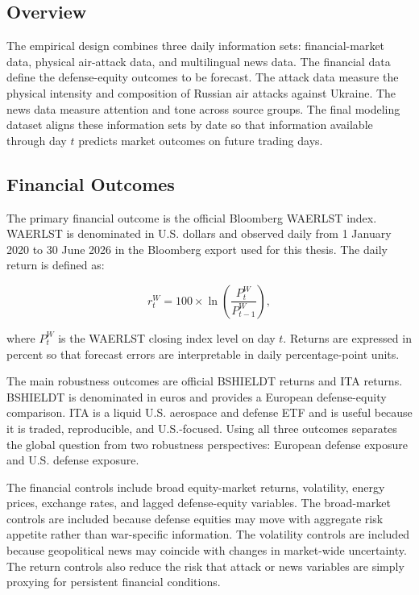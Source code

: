 \documentclass[12pt,a4paper]{article}
\begin{document}
\subsection{Overview}

The empirical design combines three daily information sets: financial-market data, physical air-attack data, and multilingual news data. The financial data define the defense-equity outcomes to be forecast. The attack data measure the physical intensity and composition of Russian air attacks against Ukraine. The news data measure attention and tone across source groups. The final modeling dataset aligns these information sets by date so that information available through day $t$ predicts market outcomes on future trading days.

\subsection{Financial Outcomes}

The primary financial outcome is the official Bloomberg WAERLST index. WAERLST is denominated in U.S. dollars and observed daily from 1 January 2020 to 30 June 2026 in the Bloomberg export used for this thesis. The daily return is defined as:

\begin{equation}
r^{W}_{t} = 100 \times \ln\left(\frac{P^{W}_{t}}{P^{W}_{t-1}}\right),
\end{equation}

where $P^{W}_{t}$ is the WAERLST closing index level on day $t$. Returns are expressed in percent so that forecast errors are interpretable in daily percentage-point units.

The main robustness outcomes are official BSHIELDT returns and ITA returns. BSHIELDT is denominated in euros and provides a European defense-equity comparison. ITA is a liquid U.S. aerospace and defense ETF and is useful because it is traded, reproducible, and U.S.-focused. Using all three outcomes separates the global question from two robustness perspectives: European defense exposure and U.S. defense exposure.

The financial controls include broad equity-market returns, volatility, energy prices, exchange rates, and lagged defense-equity variables. The broad-market controls are included because defense equities may move with aggregate risk appetite rather than war-specific information. The volatility controls are included because geopolitical news may coincide with changes in market-wide uncertainty. The return controls also reduce the risk that attack or news variables are simply proxying for persistent financial conditions.
\end{document}
